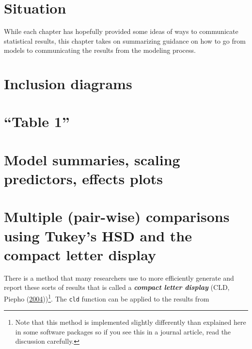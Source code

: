 \documentclass[
]{book}
\begin{document}
\hypertarget{section15-1}{%
\section{Situation}\label{section15-1}}

While each chapter has hopefully provided some ideas of ways to communicate statistical results, this chapter takes on summarizing guidance on how to go from models to communicating the results from the modeling process.

\hypertarget{section15-2}{%
\section{Inclusion diagrams}\label{section15-2}}

\hypertarget{section15-3}{%
\section{``Table 1''}\label{section15-3}}

\hypertarget{section15-4}{%
\section{Model summaries, scaling predictors, effects plots}\label{section15-4}}

\hypertarget{section15-5}{%
\section{Multiple (pair-wise) comparisons using Tukey's HSD and the compact letter display}\label{section15-5}}

\indent There is a method that many researchers use to more efficiently generate and
report these sorts of results that is called a \textbf{\emph{compact letter display}} 
(CLD, Piepho (\protect\hyperlink{ref-Piepho2004}{2004}))\footnote{Note that this method is implemented slightly differently than explained here in some software packages so if you see this in a journal article, read the discussion carefully.}. The \texttt{cld} function can be applied to the results from
\end{document}
